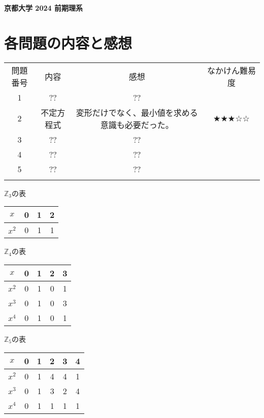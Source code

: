 \documentclass[11pt]{article}
\begin{document}
\begin{center}
{\LARGE \textbf{京都大学 2024 前期理系}}
\end{center}
\vspace{2mm}

\section*{各問題の内容と感想}

\renewcommand{\arraystretch}{1.3} %
\begin{tabular}{!{\vrule width 1pt}c!{\vrule width 1pt}c!{\vrule width 1pt}c!{\vrule width 1pt}c!{\vrule width 1pt}}
\Xhline{1pt}
 問題番号 & 内容 & 感想 & なかけん難易度\\
\Xhline{1pt} %
1 & ?? & ?? & \\
\Xhline{1pt}
2 & 不定方程式 & 変形だけでなく、最小値を求める意識も必要だった。 & ★★★☆☆\\
\Xhline{1pt}
3 & ?? & ?? & \\
\Xhline{1pt}
4 & ?? & ?? & \\
\Xhline{1pt}
5 & ?? & ?? & \\
\Xhline{1pt}
\end{tabular}

\vspace{1cm}

$\mathbb{Z}_3$の表\\
\begin{tabular}{|c|c|c|c|}
\hline
$x$ & 0 & 1 & 2\\
\hline
$x^2$ & 0 & 1 & 1\\
\hline
\end{tabular}

\vspace{3mm}


$\mathbb{Z}_4$の表\\
\begin{tabular}{|c|c|c|c|c|}
\hline
$x$ & 0 & 1 & 2 & 3\\
\hline
$x^2$ & 0 & 1 & 0 & 1\\
\hline
$x^3$ & 0 & 1 & 0 & 3\\
\hline
$x^4$ & 0 & 1 & 0 & 1\\
\hline
\end{tabular}

\vspace{3mm}

$\mathbb{Z}_5$の表\\
\begin{tabular}{|c|c|c|c|c|c|}
\hline
$x$ & 0 & 1 & 2 & 3 & 4\\
\hline
$x^2$ & 0 & 1 & 4 & 4 & 1\\
\hline
$x^3$ & 0 & 1 & 3 & 2 & 4\\
\hline
$x^4$ & 0 & 1 & 1 & 1 & 1\\
\hline
\end{tabular}
\end{document}
